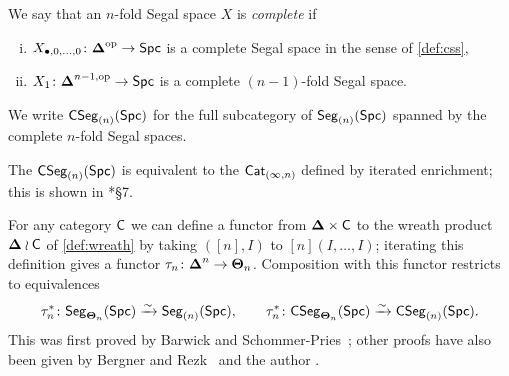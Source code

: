 \documentclass[a4paper,11pt]{article}
\begin{document}
\begin{defn}
  We say that an $n$-fold Segal space $X$ is \emph{complete} if
  \begin{enumerate}[(i)]
  \item $X_{\bullet,0,\dots,0} \colon \simp^{\op} \to \Spc$ is a
    complete Segal space in the sense of \cref{def:css},
  \item $X_{1} \colon \simp^{n-1,\op} \to \Spc$ is a complete
    $(n-1)$-fold Segal space.
  \end{enumerate}
  We write $\textup{\textsf{CSeg}}_{(n)}(\textup{\textsf{Spc}})$ for the full subcategory of
  $\textup{\textsf{Seg}}_{(n)}(\textup{\textsf{Spc}})$ spanned by the complete $n$-fold Segal spaces.
\end{defn}

\begin{remark}
  The \icat{} $\textup{\textsf{CSeg}}_{(n)}(\textup{\textsf{Spc}})$ is equivalent to the \icat{}
  $\textup{\textsf{Cat}}_{(\infty,n)}$ defined by iterated enrichment; this is shown in
  \cite{enrcomp}*{\S 7}.
\end{remark}

\begin{remark}
  For any category $\textup{\textsf{C}}$ we can define a functor from $\boldsymbol{\Delta} \times
  \textup{\textsf{C}}$ to the wreath product $\boldsymbol{\Delta} \wr \textup{\textsf{C}}$ of \cref{def:wreath} by
  taking $([n], I)$ to $[n](I,\dots,I)$; iterating this definition
  gives a functor $\tau_{n} \colon \simp^{n} \to \bT_{n}$. Composition
  with this functor restricts to equivalences
  \[ \tau_{n}^{*} \colon \Seg_{\bT_{n}}(\Spc) \isoto \Seg_{(n)}(\Spc),
    \qquad \tau_{n}^{*} \colon \CSeg_{\bT_{n}}(\Spc) \isoto
    \CSeg_{(n)}(\Spc).\]
  This was first proved by Barwick and
  Schommer-Pries~\cite{BSP}; other proofs have also been given by
  Bergner and Rezk~\cite{BergnerRezk} and the author \cite{thetan}.
\end{remark}
\end{document}
